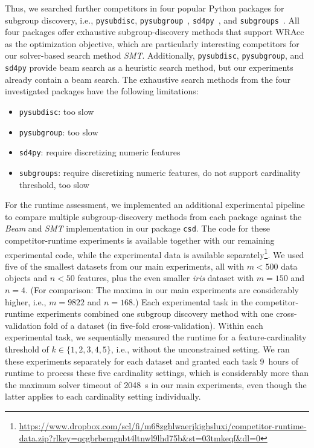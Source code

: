 \documentclass{article}
\begin{document}
Thus, we searched further competitors in four popular Python packages for subgroup discovery, i.e., \texttt{pysubdisc}, \texttt{pysubgroup}~\cite{lemmerich2019pysubgroup}, \texttt{sd4py}~\cite{hudson2023subgroup}, and \texttt{subgroups}~\cite{lopez2024subgroups}.
All four packages offer exhaustive subgroup-discovery methods that support WRAcc as the optimization objective, which are particularly interesting competitors for our solver-based search method \emph{SMT}.
Additionally, \texttt{pysubdisc}, \texttt{pysubgroup}, and \texttt{sd4py} provide beam search as a heuristic search method, but our experiments already contain a beam search.
The exhaustive search methods from the four investigated packages have the following limitations:
%
\begin{itemize}[noitemsep]
	\item \texttt{pysubdisc}: too slow
	\item \texttt{pysubgroup}: too slow
	\item \texttt{sd4py}: require discretizing numeric features
	\item \texttt{subgroups}: require discretizing numeric features, do not support cardinality threshold, too slow
\end{itemize}
%
For the runtime assessment, we implemented an additional experimental pipeline to compare multiple subgroup-discovery methods from each package against the \emph{Beam} and \emph{SMT} implementation in our package \texttt{csd}.
The code for these competitor-runtime experiments is available together with our remaining experimental code, while the experimental data is available separately\footnote{\url{https://www.dropbox.com/scl/fi/m68zghlwaerjkighsluxi/competitor-runtime-data.zip?rlkey=qcgbrbemgnbt4ltnwl9lhd75b&st=03tmkeqf&dl=0}}.
We used five of the smallest datasets from our main experiments, all with $m < 500$ data objects and $n < 50$ features, plus the even smaller \emph{iris} dataset with $m = 150$ and $n = 4$.
(For comparison: The maxima in our main experiments are considerably higher, i.e., $m = 9822$ and $n = 168$.)
Each experimental task in the competitor-runtime experiments combined one subgroup discovery method with one cross-validation fold of a dataset (in five-fold cross-validation).
Within each experimental task, we sequentially measured the runtime for a feature-cardinality threshold of $k \in \{1, 2, 3, 4, 5\}$, i.e., without the unconstrained setting.
We ran these experiments separately for each dataset and granted each task 9~hours of runtime to process these five cardinality settings, which is considerably more than the maximum solver timeout of 2048~s in our main experiments, even though the latter applies to each cardinality setting individually.
\end{document}
